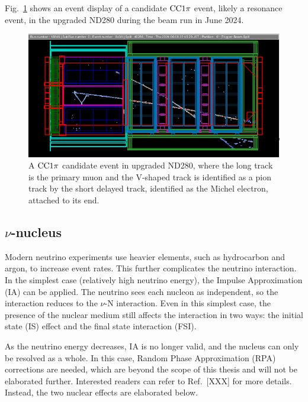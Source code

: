 Fig.~\ref{fig:cc1pi} shows an event display of a candidate $\textrm{CC}1\pi$ event, likely a resonance event, in the upgraded ND280 during the beam run in June 2024.

\begin{figure}[!htb] 	
    \centering 		
    \includegraphics[width=\sgfigwid\textwidth]{figures/shortME.png}
    \caption{\label{fig:cc1pi} A $\textrm{CC}1\pi$ candidate event in upgraded ND280, where the long track is the primary muon and the V-shaped track is identified as a pion track by the short delayed track, identified as the Michel electron, attached to its end.} 
\end{figure}

\subsection{$\nu$-nucleus}
Modern neutrino experiments use heavier elements, such as hydrocarbon and argon, to increase event rates.
This further complicates the neutrino interaction.
In the simplest case (relatively high neutrino energy), the Impulse Approximation (IA) can be applied.
The neutrino sees each nucleon as independent, so the interaction reduces to the $\nu$-N interaction.
Even in this simplest case, the presence of the nuclear medium still affects the interaction in two ways: the initial state (IS) effect and the final state interaction (FSI).

As the neutrino energy decreases, IA is no longer valid, and the nucleus can only be resolved as a whole.
In this case, Random Phase Approximation (RPA) corrections are needed, which are beyond the scope of this thesis and will not be elaborated further. 
Interested readers can refer to Ref.~[XXX] for more details.
Instead, the two nuclear effects are elaborated below.

